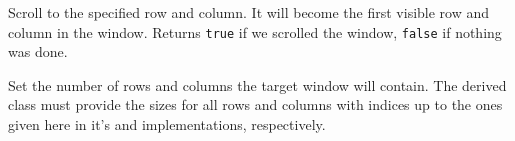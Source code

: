

Scroll to the specified row and column. It will become the first visible row
and column in the window. Returns {\tt true} if we scrolled the window,
{\tt false} if nothing was done.


\label{wxvarhvscrollhelpersetrowcolumncount}


Set the number of rows and columns the target window will contain. The
derived class must provide the sizes for all rows and columns with indices up
to the ones given here in it's 
and  implementations,
respectively.



